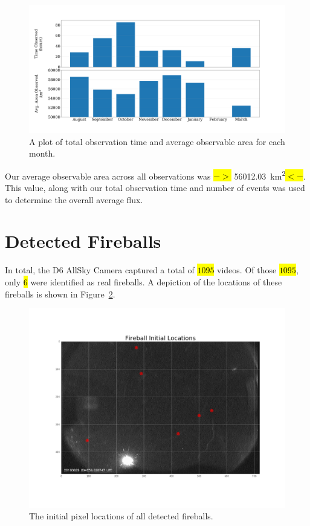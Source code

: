 \begin{figure}[ht!]
  \centering
  \includegraphics[scale=0.25]{images/time_vs_areaobs_plot.png}
  \caption{A plot of total observation time and average observable area for each month. }
  \label{time_area}
\end{figure}

Our average observable area across all observations was \hl{$->$} \SI{56012.03}{\square\kilo\meter}\hl{$<-$}.
This value, along with our total observation time and number of events was used to determine the overall average flux.


\section{Detected Fireballs}

In total, the D6 AllSky Camera captured a total of \hl{$1095$} videos.  
Of those \hl{$1095$}, only \hl{$6$} were identified as real fireballs.
A depiction of the locations of these fireballs is shown in Figure~\ref{fireball_locs}. 

\begin{figure}[ht!]
  \centering
  \includegraphics[scale=0.25]{images/fireball_initlocs.png}
  \caption{The initial pixel locations of all detected fireballs.}
  \label{fireball_locs}
\end{figure}

